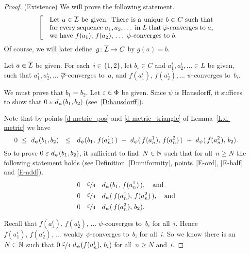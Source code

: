 \documentclass[main.tex]{subfiles}
\begin{document}
\begin{proof}
\vspace{.3em}(Existence)
We will prove the following statement.
\begin{equation}
\label{eq:T-fubext-2}
\left[\quad
\begin{minipage}{.7\columnwidth}
Let $a\in \ol L$ be given.
There is a unique $b\in C$ 
such that for every sequence $a_1,a_2,\dotsc$ in~$L$
that $\ol\varphi$-converges to~$a$,
we have $f(a_1),\,f(a_2),\,\dotsc$
$\psi$-converges to~$b$.
\end{minipage}
\right.
\end{equation}
Of course,
we will later define~$g\colon \overline L \rightarrow C$ by  $g(a) = b$.

Let $a\in\overline L$ be given.
For each~$i\in\{1,2\}$,
let $b_i\in C$
and $a^i_1,a^i_2,\dotsc\in L$
be given,
such that 
$a^i_1,a^i_2,\dotsc$
 $\overline\varphi$-converges to~$a$,
and $f(a^i_1),\,f(a^i_2),\dotsc$
$\psi$-converges to~$b_i$.

We must prove that $b_1=b_2$.
Let $\varepsilon\in\Phi$ be given.
Since $\psi$ is Hausdorff,
it suffices to show that $0\ \ve\ \ld\psi(b_1,b_2)$
(see~\ref{D:hausdorff}).

Note that
by
points \ref{d-metric_pos}
and \ref{d-metric_triangle}
of Lemma~\ref{L:d-metric}
we have
\begin{equation*}
0 \ \leq\ 
\ld\psi(b_1,b_2)
\ \ \leq\ \ 
\ld\psi(b_1,\,f(a^1_n)\,)
\ +\  
\ld\psi(\,f(a^1_n),\,f(a^2_n)\,)
\ +\ 
\ld\psi(\,f(a^2_n),\,b_2).
\end{equation*}
So to prove 
 $0\ \ve\ \ld\psi(b_1,b_2)$,
it sufficient to find~$N\in\mathbb{N}$
such that for all~$n\geq N$
the following statement holds
(see Definition~\ref{D:uniformity},
points~\ref{E-ord}, \ref{E-half} and \ref{E-add}).
\begin{alignat*}{3}
0\quad &\smash{\nicefrac{\textstyle{\varepsilon}}{4}} \quad d_{\smash{\psi}}(b_1,\,f(a^1_n)\,),
\quad\text{and}\\
0\quad &\smash{\nicefrac{\textstyle{\varepsilon}}{4}} \quad d_{\smash{\psi}}(\,f(a^1_n),\,f(a^2_n)\,),
\quad\text{and}\\
0\quad&\smash{\nicefrac{\textstyle{\varepsilon}}{4}} \quad d_{\smash{\psi}}(\,f(a^2_n),\,b_2).
\end{alignat*}


Recall that $f(a^i_1),\,f(a^i_2),\,\dotsc$
$\psi$-converges to~$b_i$ for all~$i$.
Hence  $f(a^i_1),\,f(a^i_2),\,\dotsc$
weakly $\psi$-converges to~$b_i$ for all~$i$.
So we know  there is an~$N\in\mathbb{N}$ such that
$0 \ \dtn\ve4\ \ld\psi(f(a^i_n),\,b_i)$
for all~$n\geq N$ and~$i$.


\end{proof}
\end{document}

